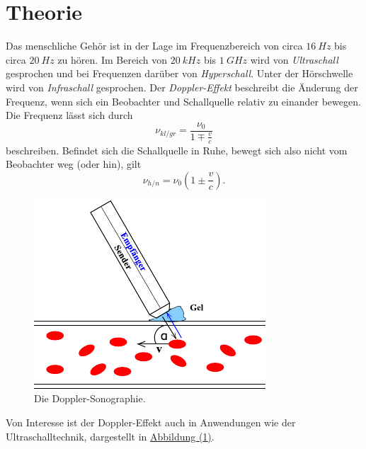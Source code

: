 \section{Theorie}
\label{sec:Theorie}

Das menschliche Gehör ist in der Lage im Frequenzbereich von circa $\qty{16}{Hz}$ bis circa $\qty{20}{Hz}$ zu hören.
Im Bereich von $\qty{20}{kHz}$ bis $\qty{1}{GHz}$ wird von \textit{Ultraschall} gesprochen und bei Frequenzen darüber von \textit{Hyperschall}.
Unter der Hörschwelle wird von \textit{Infraschall} gesprochen.
Der \textit{Doppler-Effekt} beschreibt die Änderung der Frequenz, wenn sich ein Beobachter und Schallquelle relativ zu einander bewegen.
Die Frequenz lässt sich durch
\begin{equation} \label{eq:doppler1}
    \nu_{kl/gr} = \frac{\nu_0}{1 \mp \frac{v}{c}}
\end{equation}
beschreiben.
Befindet sich die Schallquelle in Ruhe, bewegt sich also nicht vom Beobachter weg (oder hin), gilt
\begin{equation} \label{eq:doppler2}
    \nu_{h/n} = \nu_0 \left(1 \pm \frac{v}{c}\right).
\end{equation}
\begin{figure}
    \center
    \includegraphics[width=\linewidth]{pictures/Skizze1.pdf}
    \caption{Die Doppler-Sonographie. \cite{us3}}
    \label{fig:Skizze1}
\end{figure}
Von Interesse ist der Doppler-Effekt auch in Anwendungen wie der Ultraschalltechnik, dargestellt in \hyperref[fig:Skizze1]{Abbildung (\ref{fig:Skizze1})}.
